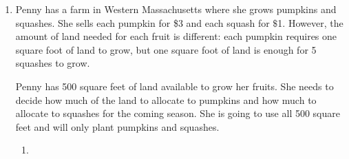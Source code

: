 \documentclass{article}
\theoremstyle{theorem}
\begin{document}
\begin{enumerate}
  In the remaining parts, fill in the blank with ``$<$'' or ``$>$''. Again, no explanation is necessary.

  \begin{enumerate}[resume]
  \item
    \begin{problem}
      $f''(a) \cfitb{0.25in}{>} 0$
    \end{problem}

    \begin{solution}
      The graph is concave up at $x = a$.
    \end{solution}

  \item
    \begin{problem}
      $f''(b) \cfitb{0.25in}{<} 0$
    \end{problem}

    \begin{solution}
      The graph is concave down at $x = b$.
    \end{solution}

  \item
    \begin{problem}[\newpage]
      $f''(c) \cfitb{0.25in}{>} 0$
    \end{problem}

    \begin{solution}
      The graph is concave up at $x = c$.
    \end{solution}

  \end{enumerate}

\item \label{fall2018-midterm-6}  

  Penny has a farm in Western Massachusetts where she grows pumpkins and squashes. She sells each pumpkin for \$3 and each squash for $\$$1. However, the amount of land needed for each fruit is different: each pumpkin requires one square foot of land to grow, but one square foot of land is enough for 5 squashes to grow.

  Penny has 500 square feet of land available to grow her fruits. She needs to decide how much of the land to allocate to pumpkins and how much to allocate to squashes for the coming season. She is going to use all 500 square feet and will only plant pumpkins and squashes.

  \begin{enumerate}
  \item \label{fall2018-midterm-6a}


\end{enumerate}
\end{enumerate}
\end{document}
